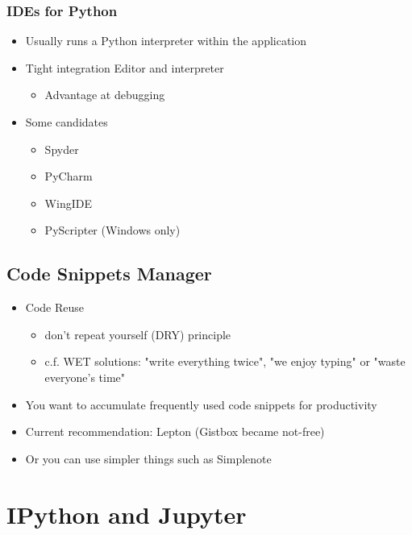 \documentclass[10pt,article]{article}
\begin{document}
\subsubsection{IDEs for Python}
\label{sec:org8940a23}
\begin{itemize}
\item Usually runs a Python interpreter within the application
\item Tight integration Editor and interpreter

\begin{itemize}
\item Advantage at debugging
\end{itemize}

\item Some candidates

\begin{itemize}
\item Spyder
\item PyCharm
\item WingIDE
\item PyScripter (Windows only)
\end{itemize}
\end{itemize}

\subsection{Code Snippets Manager}
\label{sec:org0021d05}
\begin{itemize}
\item Code Reuse 

\begin{itemize}
\item don't repeat yourself (DRY) principle
\item c.f. WET solutions: "write everything twice", "we enjoy typing" or "waste
everyone's time"
\end{itemize}

\item You want to accumulate frequently used code snippets for productivity
\item Current recommendation: Lepton (Gistbox became not-free)
\item Or you can use simpler things such as Simplenote
\end{itemize}
\section{IPython and Jupyter}
\label{sec:org9a3f91d}
\end{document}
